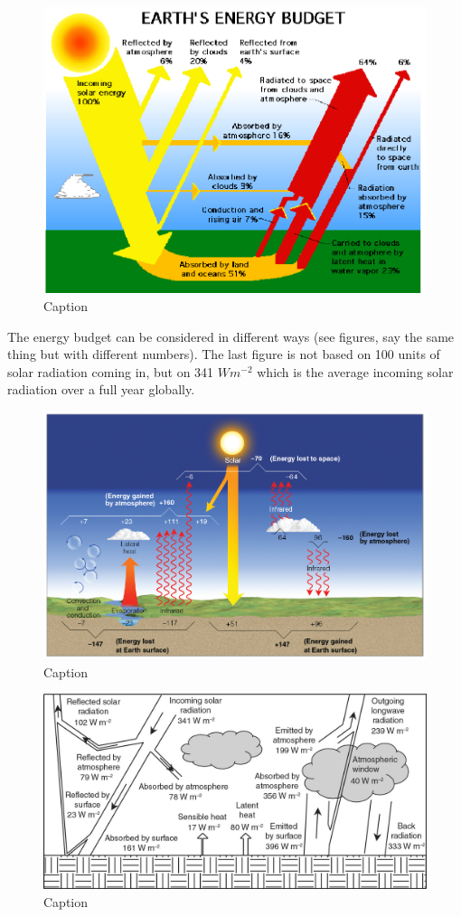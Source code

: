 \documentclass[oneside]{book}
\begin{document}
\begin{figure}

{\centering \includegraphics[width=0.7\linewidth]{figures/Figure139} 

}

\caption{Caption}\label{fig:EnergyBudget}
\end{figure}

The energy budget can be considered in different ways (see figures, say
the same thing but with different numbers). The last figure is not based
on 100 units of solar radiation coming in, but on 341 \(W m^{-2}\) which
is the average incoming solar radiation over a full year globally.

\begin{figure}

{\centering \includegraphics[width=0.8\linewidth]{figures/Figure140} 

}

\caption{Caption}\label{fig:EnergyBudget2}
\end{figure}

\begin{figure}

{\centering \includegraphics[width=0.7\linewidth]{figures/Figure141} 

}

\caption{Caption}\label{fig:EnergyBudget3}
\end{figure}
\end{document}
